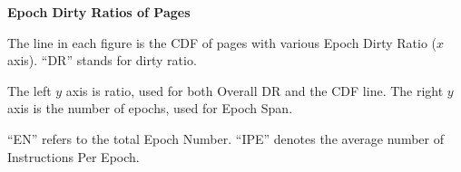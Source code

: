 \documentclass[10pt,a4paper]{article}
\begin{document}
\textbf{\large Epoch Dirty Ratios of Pages}
\vspace{5pt}

The line in each figure is the CDF of pages with various Epoch Dirty Ratio ($x$ axis). ``DR'' stands for dirty ratio.

The left $y$ axis is ratio, used for both Overall DR and the CDF line. The right $y$ axis is the number of epochs, used for Epoch Span.

``EN'' refers to the total Epoch Number. ``IPE'' denotes the average number of Instructions Per Epoch.




\end{document}
